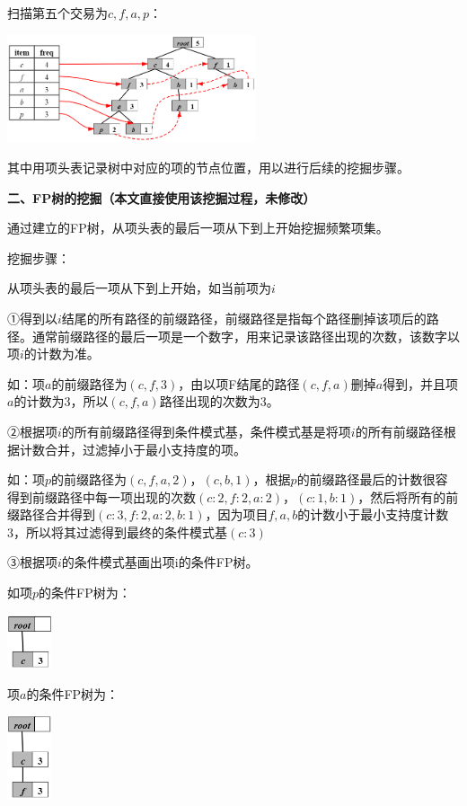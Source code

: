 \documentclass[UTF8,a4paper]{ctexart}
\begin{document}
  扫描第五个交易为{\color{red}$c,f,a,p$}：
  
  \includegraphics[width=0.55\textwidth]{5_trans}

  其中用项头表记录树中对应的项的节点位置，用以进行后续的挖掘步骤。

  \textbf{二、FP树的挖掘（本文直接使用该挖掘过程，未修改）}

  通过建立的FP树，从项头表的最后一项从下到上开始挖掘频繁项集。

  挖掘步骤：

  从项头表的最后一项从下到上开始，如当前项为$i$
  
  ①得到以$i$结尾的所有路径的前缀路径，前缀路径是指每个路径删掉该项后的路径。通常前缀路径的最后一项是一个数字，用来记录该路径出现的次数，该数字以项$i$的计数为准。

  如：项$a$的前缀路径为$(c,f,3)$，由以项F结尾的路径$(c,f,a)$删掉$a$得到，并且项$a$的计数为3，所以$(c,f,a)$路径出现的次数为3。

  ②根据项$i$的所有前缀路径得到条件模式基，条件模式基是将项$i$的所有前缀路径根据计数合并，过滤掉小于最小支持度的项。

  如：项$p$的前缀路径为$(c,f,a,2)$，$(c,b,1)$，根据$p$的前缀路径最后的计数很容得到前缀路径中每一项出现的次数$(c:2,f:2,a:2)$，$(c:1,b:1)$，然后将所有的前缀路径合并得到$(c:3,f:2,a:2,b:1)$，因为项目$f,a,b$的计数小于最小支持度计数3，所以将其过滤得到最终的条件模式基$(c:3)$

  ③根据项$i$的条件模式基画出项i的条件FP树。

  如{\color{red}项$p$的条件FP树为}：

  \includegraphics[width=0.1\textwidth]{p_baseTree}

  {\color{red}项$a$的条件FP树为}：

  \includegraphics[width=0.1\textwidth]{a_baseTree}
\end{document}
